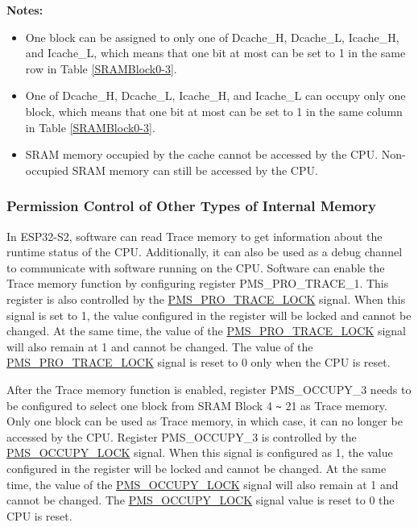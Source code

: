 \documentclass[main\_\_EN.tex]{subfiles}
\begin{document}
{\bfseries Notes:}
\begin{itemize}
    \item One block can be assigned to only one of Dcache\_H, Dcache\_L, Icache\_H, and Icache\_L, which means that one bit at most can be set to 1 in the same row in Table \ref{SRAMBlock0-3}.
    \item One of Dcache\_H, Dcache\_L, Icache\_H, and Icache\_L can occupy only one block, which means that one bit at most can be set to 1 in the same column in Table \ref{SRAMBlock0-3}.
    \item SRAM memory occupied by the cache cannot be accessed by the CPU. Non-occupied SRAM memory can still be accessed by the CPU.
\end{itemize}


\subsubsection{Permission Control of Other Types of Internal Memory}
In ESP32-S2, software can read Trace memory to get information about the runtime status of the CPU. Additionally, it can also be used as a debug channel to communicate with software running on the CPU. Software can enable the Trace memory function by configuring register PMS\_PRO\_TRACE\_1. This register is also controlled by the \hyperref[fielddesc:PMSPROTRACELOCK]{PMS\_PRO\_TRACE\_LOCK} signal. When this signal is set to 1, the value configured in the register will be locked and cannot be changed. At the same time, the value of the \hyperref[fielddesc:PMSPROTRACELOCK]{PMS\_PRO\_TRACE\_LOCK} signal will also remain at 1 and cannot be changed. The value of the \hyperref[fielddesc:PMSPROTRACELOCK]{PMS\_PRO\_TRACE\_LOCK} signal is reset to 0 only when the CPU is reset.

After the Trace memory function is enabled, register PMS\_OCCUPY\_3 needs to be configured to select one block from SRAM Block 4 \verb+~+ 21 as Trace memory. Only one block can be used as Trace memory, in which case, it can no longer be accessed by the CPU. Register PMS\_OCCUPY\_3 is controlled by the \hyperref[fielddesc:PMSOCCUPYLOCK]{PMS\_OCCUPY\_LOCK} signal. When this signal is configured as 1, the value configured in the register will be locked and cannot be changed. At the same time, the value of the \hyperref[fielddesc:PMSOCCUPYLOCK]{PMS\_OCCUPY\_LOCK} signal will also remain at 1 and cannot be changed. The \hyperref[fielddesc:PMSOCCUPYLOCK]{PMS\_OCCUPY\_LOCK} signal value is reset to 0  the CPU is reset.
\end{document}
